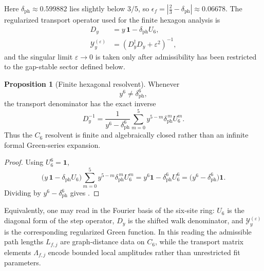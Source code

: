 \documentclass[11pt,a4paper]{article}
\theoremstyle{definition}
\newtheorem{proposition}[theorem]{Proposition}
\theoremstyle{remark}
\begin{document}
Here $\delta_{\mathrm{ph}}\approx \num{0.599882}$ lies slightly below $3/5$, so $\epsilon_f=|\frac23-\delta_{\mathrm{ph}}|\approx \num{0.06678}$. The regularized transport operator used for the finite hexagon analysis is
\begin{equation}
\label{eq:yukawa-kernel}
\begin{aligned}
D_y&=y\,\mathbf 1-\delta_{\mathrm{ph}}U_6,\\
\mathcal Y_y^{(\varepsilon)}&=(D_y^\dagger D_y+\varepsilon^2)^{-1},
\end{aligned}
\end{equation}
and the singular limit $\varepsilon\to0$ is taken only after admissibility has been restricted to the gap-stable sector defined below.

\begin{proposition}[Finite hexagonal resolvent]
\label{prop:finite-hexagonal-resolvent}
Whenever
\[
y^6\neq \delta_{\mathrm{ph}}^6,
\]
the transport denominator has the exact inverse
\begin{equation}
\label{eq:finite-hexagonal-resolvent}
D_y^{-1}
=
\frac{1}{y^6-\delta_{\mathrm{ph}}^6}
\sum_{m=0}^{5}y^{5-m}\delta_{\mathrm{ph}}^{\,m}U_6^m.
\end{equation}
Thus the $C_6$ resolvent is finite and algebraically closed rather than an infinite formal Green-series expansion.
\end{proposition}

\begin{proof}
Using $U_6^6=\mathbf 1$,
\[
\bigl(y\,\mathbf 1-\delta_{\mathrm{ph}}U_6\bigr)
\sum_{m=0}^{5}y^{5-m}\delta_{\mathrm{ph}}^{\,m}U_6^m
=
y^6\mathbf 1-\delta_{\mathrm{ph}}^6U_6^6
=
\bigl(y^6-\delta_{\mathrm{ph}}^6\bigr)\mathbf 1.
\]
Dividing by $y^6-\delta_{\mathrm{ph}}^6$ gives .
\end{proof}

Equivalently, one may read  in the Fourier basis of the six-site ring: $U_6$ is the diagonal form of the step operator, $D_y$ is the shifted walk denominator, and $\mathcal Y_y^{(\varepsilon)}$ is the corresponding regularized Green function. In this reading the admissible path lengths $L_{f,j}$ are graph-distance data on $C_6$, while the transport matrix elements $\Lambda_{f,j}$ encode bounded local amplitudes rather than unrestricted fit parameters.
\end{document}
